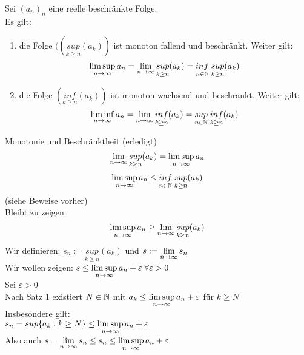 \documentclass[../ana1u.tex]{subfiles}
\begin{document}
\begin{lem}
    Sei \((a_n)_n\) eine reelle beschränkte Folge.\\
    Es gilt: 
    \begin{enumerate}
        \item 
            die Folge \(((\underset{k \geq n}{sup}(a_k))\) ist monoton fallend und beschränkt. Weiter gilt:
            \[\limsup\limits_{n\rightarrow\infty} a_n = \lim\limits_{n\rightarrow\infty} \underset{k \geq n}{sup} (a_k) = \underset{n \in \mathbb{N}}{inf} \; \underset{k \geq n}{sup} (a_k)\]
        \item 
            die Folge \((\underset{k \geq n}{inf} (a_k))\) ist monoton wachsend und beschränkt. Weiter gilt:
            \[\liminf\limits_{n\rightarrow\infty} a_n = \lim\limits_{n\rightarrow\infty} \underset{k \geq n}{inf} (a_k) = \underset{n \in \mathbb{N}}{sup} \; \underset{k \geq n}{inf} (a_k)\]
    \end{enumerate}		
\end{lem}
\begin{bew}
    Monotonie und Beschränktheit (erledigt)\\
    \[\lim\limits_{n\rightarrow\infty} \underset{k \geq n}{sup} (a_k) = \limsup\limits_{n\rightarrow\infty} a_n\]
    \[\limsup\limits_{n\rightarrow\infty} a_n \leq \underset{n \in \mathbb{N}}{inf} \; \underset{k \geq n}{sup} (a_k)\]
    (siehe Beweise vorher)\\
    Bleibt zu zeigen:
    \[\limsup\limits_{n\rightarrow\infty} a_n \geq \lim\limits_{n\rightarrow\infty} \underset{k \geq n}{sup} (a_k)\]
    Wir definieren: \(s_n := \underset{k \geq n}{sup} (a_k)\) und \(s := \lim\limits_{n\rightarrow\infty} s_n\)\\
    Wir wollen zeigen: \(s \leq \limsup\limits_{n\rightarrow\infty} a_n + \varepsilon \; \forall \varepsilon > 0\)\\
    Sei \(\varepsilon > 0\)\\
    Nach Satz 1 existiert \(N \in \mathbb{N}\) mit \(a_k \leq \limsup\limits_{n\rightarrow\infty} a_n + \varepsilon\) für \(k \geq N\)\\
    Insbesondere gilt:\\
    \(s_n = sup\{a_k: k \geq N\} \leq \limsup\limits_{n\rightarrow\infty} a_n + \varepsilon\)\\
    Also auch \(s = \lim\limits_{n\rightarrow\infty} s_n \leq s_n \leq \limsup\limits_{n\rightarrow\infty} a_n + \varepsilon\)\\
\end{bew}	
\end{document}
